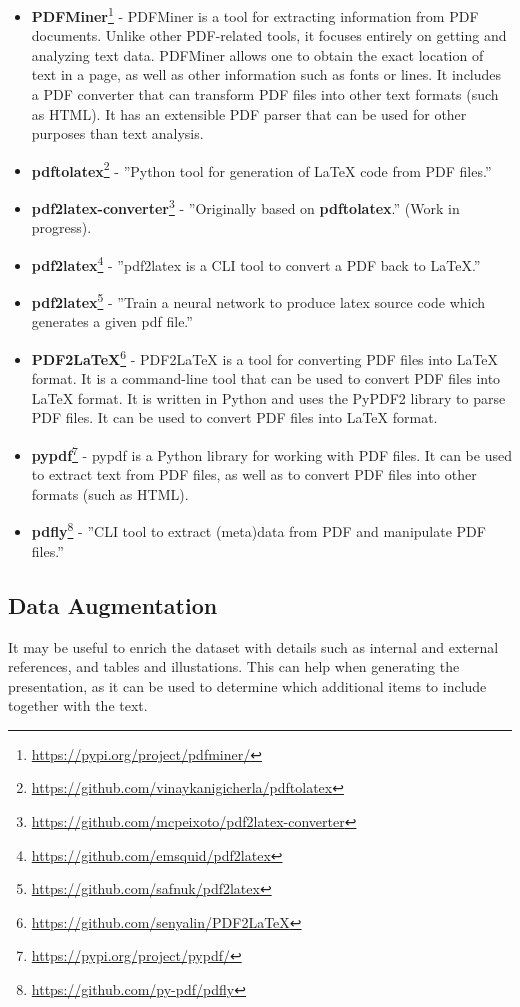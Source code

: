 \begin{itemize}
    \item \textbf{PDFMiner}\footnote{\url{https://pypi.org/project/pdfminer/}} - PDFMiner is a tool for extracting information from PDF documents. Unlike other PDF-related tools, it focuses entirely on getting and analyzing text data. PDFMiner allows one to obtain the exact location of text in a page, as well as other information such as fonts or lines. It includes a PDF converter that can transform PDF files into other text formats (such as HTML). It has an extensible PDF parser that can be used for other purposes than text analysis.
    \item \textbf{pdftolatex}\footnote{\url{https://github.com/vinaykanigicherla/pdftolatex}} - ''Python tool for generation of \LaTeX{} code from PDF files.''
    \item \textbf{pdf2latex-converter}\footnote{\url{https://github.com/mcpeixoto/pdf2latex-converter}} - ''Originally based on \textbf{pdftolatex}.'' (Work in progress).
    \item \textbf{pdf2latex}\footnote{\url{https://github.com/emsquid/pdf2latex}} - ''pdf2latex is a CLI tool to convert a PDF back to LaTeX.''
    \item \textbf{pdf2latex}\footnote{\url{https://github.com/safnuk/pdf2latex}} - ''Train a neural network to produce latex source code which generates a given pdf file.''
    \item \textbf{PDF2LaTeX}\footnote{\url{https://github.com/senyalin/PDF2LaTeX}} - PDF2LaTeX is a tool for converting PDF files into \LaTeX{} format. It is a command-line tool that can be used to convert PDF files into \LaTeX{} format. It is written in Python and uses the PyPDF2 library to parse PDF files. It can be used to convert PDF files into \LaTeX{} format.
    \item \textbf{pypdf}\footnote{\url{https://pypi.org/project/pypdf/}} - pypdf is a Python library for working with PDF files. It can be used to extract text from PDF files, as well as to convert PDF files into other formats (such as HTML).
    \item \textbf{pdfly}\footnote{\url{https://github.com/py-pdf/pdfly}} - ''CLI tool to extract (meta)data from PDF and manipulate PDF files.''
\end{itemize}

\subsection{Data Augmentation}
It may be useful to enrich the dataset with details such as internal and external references, and tables and illustations. This can help when generating the presentation, as it can be used to determine which additional items to include together with the text.

